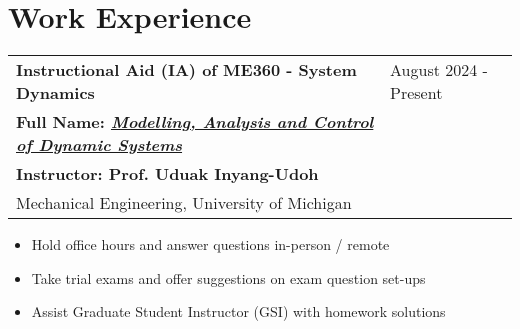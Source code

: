 \documentclass[letter,12pt]{article}
\begin{document}


\section{Work Experience}

\begin{tabularx}{\linewidth}{@{}l X@{}}
\large \textbf{Instructional Aid (IA) of ME360 - System Dynamics} & \hfill {August 2024 - Present} \\
\small \textbf{Full Name: \href{https://me.engin.umich.edu/wp-content/uploads/2023/07/ME-360-Course-Profile.pdf}{\textit{Modelling, Analysis and Control of Dynamic Systems}}} & \hfill \small{} \\
\small \textbf{Instructor: Prof. Uduak Inyang-Udoh} & \hfill \small{} \\
\normalsize{Mechanical Engineering, University of Michigan} & \hfill \small{} \\
\end{tabularx}

\begin{itemize}[
    rightmargin=2cm
]
    \setlength{\itemsep}{1pt}
    \setlength{\parskip}{0pt}
    \setlength{\parsep}{0pt}
    \item{\small Hold office hours and answer questions in-person / remote}
    \item{\small Take trial exams and offer suggestions on exam question set-ups}
    \item{\small Assist Graduate Student Instructor (GSI) with homework solutions}

\end{itemize}
        
\end{document}
